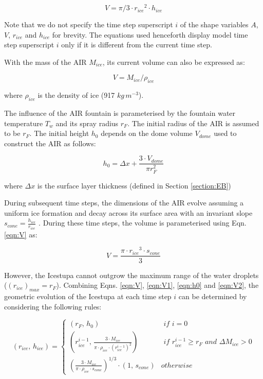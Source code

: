 \documentclass[utf8]{frontiersSCNS} %
\begin{document}
\begin{equation} V = \pi/3 \cdot {r_{ice}}^2 \cdot h_{ice} \label{eqn:V} \end{equation}

Note that we do not specify the time step superscript $i$ of the shape variables $A$, $V$, $r_{ice}$ and $h_{ice}$ for
brevity.  The equations used henceforth display model time step superscript $i$ only if it is different from the
current time step.

With the mass of the AIR $M_{ice}$, its current volume can also be expressed as:

\begin{equation} V = M_{ice} /\rho_{ice} \label{eqn:V1} \end{equation}

where $\rho_{ice}$ is the density of ice (917 $kg\, m^{-3}$).


The influence of the AIR fountain is parameterised by the fountain water temperature $T_{w}$ and its spray radius $r_F$.
The initial radius of the AIR is assumed to be $r_F$. The initial height $h_0$ depends on the dome volume
$V_{dome}$ used to construct the AIR as follows:

\begin{equation}
	h_{0} =  \Delta x + \frac{3 \cdot V_{dome}}{\pi r_F^2 }
	\label{eqn:h0}
\end{equation}

where $\Delta x$ is the surface layer thickness (defined in Section \ref{section:EB})

During subsequent time steps, the dimensions of the AIR evolve assuming a uniform ice formation and decay across
its surface area with an invariant slope $s_{cone} = \frac{h_{ice}}{r_{ice}}$ .  During
these time steps, the volume is parameterised using Eqn. \ref{eqn:V} as:

\begin{equation} V = \frac{\pi \cdot {r_{ice}}^3
		\cdot s_{cone}}{3} \label{eqn:V2} \end{equation}


However, the Icestupa cannot outgrow the maximum range of the water droplets ($(r_{ice})_{max} = r_{F}$). Combining
Eqns. \ref{eqn:V},  \ref{eqn:V1}, \ref{eqn:h0} and \ref{eqn:V2}, the geometric evolution of the Icestupa at each time step $i$ can
be determined by considering the following rules:

\begin{equation} (r_{ice},\, h_{ice}) = \left\{ \begin{array}{ll} (r_F ,\, h_0)                                                                        & \textit{ if } i=0 \\
             (r_{ice}^{i-1},\, \frac{3 \cdot M_{ice}}{\pi \cdot \rho_{ice} \cdot {(r_{ice}^{i-1})}^2}) & \textit{ if }
             r_{ice}^{i-1} \geq r_{F} \textit{ and } \Delta M_{ice} > 0                                                    \\ (\frac{3 \cdot M_{ice}}{\pi \cdot \rho_{ice} \cdot s_{cone}})^{1/3} \cdot (1,\,  s_{cone}) &
             otherwise\end{array} \right.  \label{eqn:A2} \end{equation}
\end{document}
